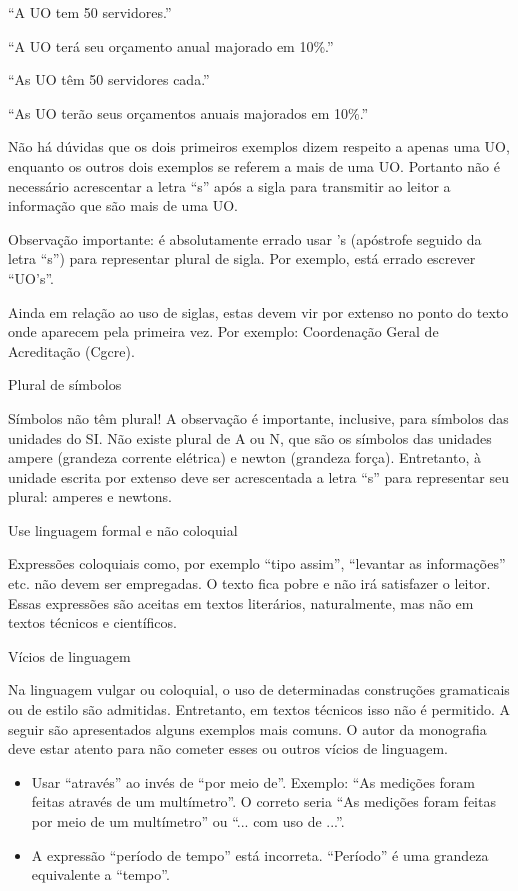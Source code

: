 \begin{enumerate}[label=\alph*)]
“A UO tem 50 servidores.”

“A UO terá seu orçamento anual majorado em 10\%.”

“As UO têm 50 servidores cada.”

“As UO terão seus orçamentos anuais majorados em 10\%.”

Não há dúvidas que os dois primeiros exemplos dizem respeito a apenas uma UO, enquanto os outros dois exemplos se referem a mais de uma UO. Portanto não é necessário acrescentar a letra “s” após a sigla para transmitir ao leitor a informação que são mais de uma UO.

Observação importante: é absolutamente errado usar ’s (apóstrofe seguido da letra “s”) para representar plural de sigla. Por exemplo, está errado escrever “UO’s”.

Ainda em relação ao uso de siglas, estas devem vir por extenso no ponto do texto onde aparecem pela primeira vez. Por exemplo: Coordenação Geral de Acreditação (Cgcre).

{\bfseries \item  Plural de símbolos}

Símbolos não têm plural! A observação é importante, inclusive, para símbolos das unidades do SI. Não existe plural de A ou N, que são os símbolos das unidades ampere (grandeza corrente elétrica) e newton (grandeza força). Entretanto, à unidade escrita por extenso deve ser acrescentada a letra “s” para representar seu plural: amperes e newtons.

{\bfseries \item  Use linguagem formal e não coloquial}

Expressões coloquiais como, por exemplo “tipo assim”, “levantar as informações” etc. não devem ser empregadas. O texto fica pobre e não irá satisfazer o leitor. Essas expressões são aceitas em textos literários, naturalmente, mas não em textos técnicos e científicos.

{\bfseries \item  Vícios de linguagem}

Na linguagem vulgar ou coloquial, o uso de determinadas construções gramaticais ou de estilo são admitidas. Entretanto, em textos técnicos isso não é permitido. A seguir são apresentados alguns exemplos mais comuns. O autor da monografia deve estar atento para não cometer esses ou outros vícios de linguagem.
\begin{itemize}
    \item Usar “através” ao invés de “por meio de”. Exemplo: “As medições foram feitas através de um multímetro”. O correto seria “As medições foram feitas por meio de um multímetro” ou “... com uso de ...”.
    \item 	A expressão “período de tempo” está incorreta. “Período” é uma grandeza equivalente a “tempo”.
\end{itemize}


\end{enumerate}
